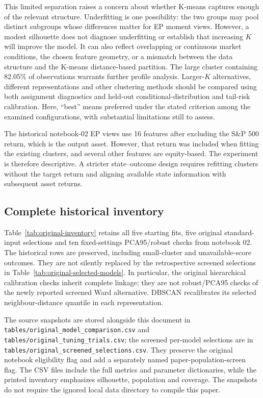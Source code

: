 \documentclass[11pt,a4paper]{article}
\begin{document}
This limited separation raises a concern about whether K-means captures enough of the relevant structure. Underfitting is one possibility: the two groups may pool distinct subgroups whose differences matter for EP moment views. However, a modest silhouette does not diagnose underfitting or establish that increasing $K$ will improve the model. It can also reflect overlapping or continuous market conditions, the chosen feature geometry, or a mismatch between the data structure and the K-means distance-based partition. The large cluster containing 82.05\% of observations warrants further profile analysis. Larger-$K$ alternatives, different representations and other clustering methods should be compared using both assignment diagnostics and held-out conditional-distribution and tail-risk calibration. Here, ``best'' means preferred under the stated criterion among the examined configurations, with substantial limitations still to assess.

The historical notebook-02 EP views use 16 features after excluding the S\&P 500 return, which is the output asset. However, that return was included when fitting the existing clusters, and several other features are equity-based. The experiment is therefore descriptive. A stricter state--outcome design requires refitting clusters without the target return and aligning available state information with subsequent asset returns.


\subsection{Complete historical inventory}

Table~\ref{tab:original-inventory} retains all five starting fits, five original standard-input selections and ten fixed-settings PCA95/robust checks from notebook 02. The historical rows are preserved, including small-cluster and unavailable-score outcomes. They are not silently replaced by the retrospective screened selections in Table~\ref{tab:original-selected-models}. In particular, the original hierarchical calibration checks inherit complete linkage; they are not robust/PCA95 checks of the newly reported screened Ward alternative. DBSCAN recalibrates its selected neighbour-distance quantile in each representation.

The source snapshots are stored alongside this document in \texttt{tables/original\_model\_comparison.csv} and \texttt{tables/original\_tuning\_trials.csv}; the screened per-model selections are in \texttt{tables/original\_screened\_selections.csv}. They preserve the original notebook eligibility flag and add a separately named paper-population-screen flag. The CSV files include the full metrics and parameter dictionaries, while the printed inventory emphasizes silhouette, population and coverage. The snapshots do not require the ignored local data directory to compile this paper.
\end{document}

